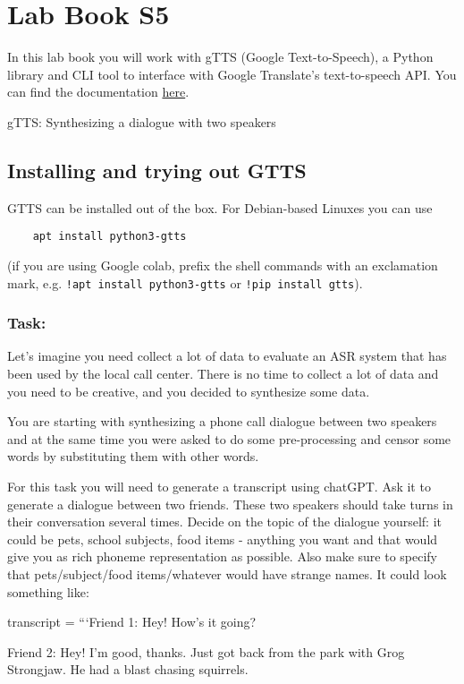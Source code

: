 \documentclass{../labbook}
\begin{document}
\section{Lab Book S5}
\noindent In this lab book you will work with gTTS (Google Text-to-Speech), a Python library and CLI tool to interface with Google Translate's text-to-speech API. 
You can find the documentation \href{http://gtts.readthedocs.org/}{here}.

\begin{problem}{1}{10}{gTTS: Synthesizing a dialogue with two speakers}

\subsection*{Installing and trying out GTTS}
GTTS can be installed out of the box. For Debian-based Linuxes you can use 
\begin{verbatim} 
    apt install python3-gtts
\end{verbatim} (if you are using Google colab, prefix the shell commands with an exclamation mark, e.g. 
\texttt{!apt install python3-gtts} or \texttt{!pip install gtts}).
\smallskip

\subsubsection*{Task:}
\noindent Let's imagine you need collect a lot of data to evaluate an ASR system that has been used by the local call center. There is no time to collect a lot of data and you need to be creative, and you decided to synthesize some data. 

You are starting with synthesizing a phone call dialogue between two speakers and at the same time you were asked to do some pre-processing and censor some words by substituting them with other words. 

For this task you will need to generate a transcript using chatGPT. 
Ask it to generate a dialogue between two friends. These two speakers should take turns in their conversation several times. 
Decide on the topic of the dialogue yourself: it could be pets, school subjects, food items - anything you want and that would give you as rich phoneme representation as possible. Also make sure to specify that pets/subject/food items/whatever would have strange names. It could look something like:
    
transcript = ```Friend 1: Hey! How's it going?
    
Friend 2: Hey! I'm good, thanks. Just got back from the park with Grog Strongjaw. He had a blast chasing squirrels.


\end{problem}
\end{document}
